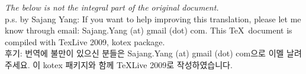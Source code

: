 \documentclass[a4paper,12pt]{article}
\begin{document}
\newpage

\noindent \emph{The below is not the integral part of the original document.} \\

\noindent p.s. by Sajang Yang: If you want to help improving this 
translation, please let me know through email: Sajang.Yang (at) gmail 
(dot) com. This \TeX\ document is compiled with TexLive 2009,
kotex package. \\

 후기: 번역에 불만이 있으신 분들은 Sajang.Yang (at) gmail (dot) 
com으로 이멜 날려 주세요. 이  kotex 패키지와 함께 TeXLive 
2009로 작성하였습니다.
\end{document}
